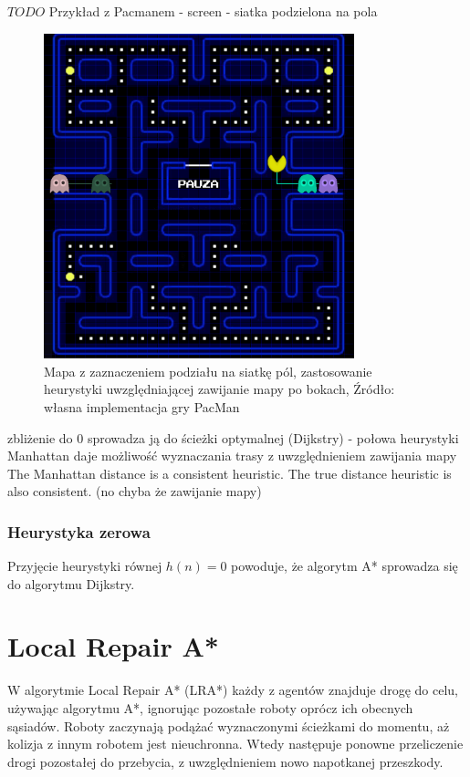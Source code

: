 $TODO$ Przykład z Pacmanem - screen - siatka podzielona na pola
\begin{figure}[H]
	\centering
	\includegraphics[width=9cm]{img/paclan1}
	\caption{Mapa z zaznaczeniem podziału na siatkę pól, zastosowanie heurystyki uwzględniającej zawijanie mapy po bokach, Źródło: własna implementacja gry PacMan}
	\label{fig:image_paclan1}
\end{figure}

zbliżenie do 0 sprowadza ją do ścieżki optymalnej (Dijkstry) - połowa heurystyki Manhattan daje możliwość wyznaczania trasy z uwzględnieniem zawijania mapy
The Manhattan distance is a consistent heuristic. The true distance heuristic is also consistent. (no chyba że zawijanie mapy)

\subsubsection{Heurystyka zerowa}
Przyjęcie heurystyki równej $h(n) = 0$ powoduje, że algorytm A* sprowadza się do algorytmu Dijkstry.

\section{Local Repair A*}
\label{ch:lra}
W algorytmie Local Repair A* (LRA*) każdy z agentów znajduje drogę do celu, używając algorytmu A*, ignorując pozostałe roboty oprócz ich obecnych sąsiadów. Roboty zaczynają podążać wyznaczonymi ścieżkami do momentu, aż kolizja z innym robotem jest nieuchronna. Wtedy następuje ponowne przeliczenie drogi pozostałej do przebycia, z uwzględnieniem nowo napotkanej przeszkody.

